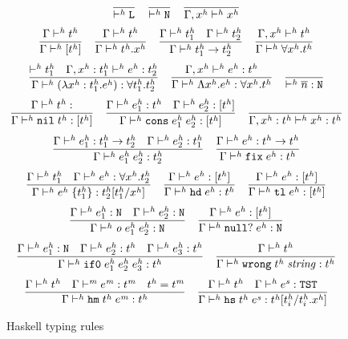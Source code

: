 \begin{figure}[p]
\[
\frac
{}
{ \vdash^{\mathit{h}} \mathtt{L}}
\quad
\frac
{}
{ \vdash^{\mathit{h}} \mathtt{N}}
\quad
\frac
{}
{\Gamma , x^{\mathit{h}} \vdash^{\mathit{h}} x^{\mathit{h}}}
\]
\[
\frac
{\Gamma \vdash^{\mathit{h}} t^{\mathit{h}}}
{\Gamma \vdash^{\mathit{h}} [t^{\mathit{h}}]}
\quad
\frac
{\Gamma \vdash^{\mathit{h}} t^{\mathit{h}}}
{\Gamma \vdash^{\mathit{h}} t^{\mathit{h}} . x^{\mathit{h}}}
\quad
\frac
{\Gamma \vdash^{\mathit{h}} t^{\mathit{h}}_{1} \quad \Gamma \vdash^{\mathit{h}} t^{\mathit{h}}_{2}}
{\Gamma \vdash^{\mathit{h}} t^{\mathit{h}}_{1} \rightarrow t^{\mathit{h}}_{2}}
\quad
\frac
{\Gamma, x^{\mathit{h}} \vdash^{\mathit{h}} t^{\mathit{h}}}
{\Gamma \vdash^{\mathit{h}} \forall x^{\mathit{h}} . t^{\mathit{h}}}
\]
\bigskip
\[
\frac
{ \vdash^{\mathit{h}} t^{\mathit{h}}_{1} \quad \Gamma , x^{\mathit{h}} : t^{\mathit{h}}_{1} \vdash^{\mathit{h}} e^{\mathit{h}} : t^{\mathit{h}}_{2}}
{\Gamma \vdash^{\mathit{h}} (\lambda x^{\mathit{h}} : t^{\mathit{h}}_{1} . e^{\mathit{h}}) : \forall t^{\mathit{h}}_{1} . t^{\mathit{h}}_{2}}
\quad
\frac
{\Gamma , x^{\mathit{h}} \vdash^{\mathit{h}} e^{\mathit{h}} : t^{\mathit{h}}}
{\Gamma \vdash^{\mathit{h}} \Lambda x^{\mathit{h}} . e^{\mathit{h}} : \forall x^{\mathit{h}} . t^{\mathit{h}}}
\quad
\frac
{}
{ \vdash^{\mathit{h}} \overline{n} : \mathtt{N}}
\]
\[
\frac
{\judeh{\env}{\vartyh}}
{\judeh{\env}{\expnils{\vartyh}}{\tylist{\vartyh}}}
\quad
\frac
{\judeh{\env}{\first{\varexph}}{\vartyh} \quad \judeh{\env}{\second{\varexph}}{\tylist{\vartyh}}}
{\judeh{\env}{\expcons{\first{\varexph}}{\second{\varexph}}}{\tylist{\vartyh}}}
\quad
\frac
{}
{\judeh{\envexte{\tyvarh}{\vartyh}}{\tyvarh}{\vartyh}}
\]
\[
\frac
{\Gamma \vdash^{\mathit{h}} e^{\mathit{h}}_{1} : t^{\mathit{h}}_{1} \rightarrow t^{\mathit{h}}_{2} \quad \Gamma \vdash^{\mathit{h}} e^{\mathit{h}}_{2} : t^{\mathit{h}}_{1}}
{\Gamma\vdash^{\mathit{h}}e^{\mathit{h}}_{1} \; e^{\mathit{h}}_{2}:t^{\mathit{h}}_2}
\quad
\frac
{\Gamma \vdash^{\mathit{h}} e^{\mathit{h}} : t^{\mathit{h}} \rightarrow t^{\mathit{h}}}
{\Gamma \vdash^{\mathit{h}} \mathtt{fix} \; e^{\mathit{h}} : t^{\mathit{h}}}
\]
\[
\frac
{\Gamma \vdash^{\mathit{h}} t^{\mathit{h}}_{1} \quad \Gamma \vdash^{\mathit{h}} e^{\mathit{h}} : \forall x^{\mathit{h}} . t^{\mathit{h}}_{2}}
{\Gamma \vdash^{\mathit{h}} e^{\mathit{h}} \; \lbrace t^{\mathit{h}}_{1} \rbrace : t^{\mathit{h}}_{2}[t^{\mathit{h}}_{1}/x^{\mathit{h}}]}
\quad
\frac
{\Gamma \vdash^{\mathit{h}} e^{\mathit{h}} : [t^{\mathit{h}}]}
{\Gamma \vdash^{\mathit{h}} \mathtt{hd} \; e^{\mathit{h}} : t^{\mathit{h}}}
\quad
\frac
{\Gamma \vdash^{\mathit{h}} e^{\mathit{h}} : [t^{\mathit{h}}]}
{\Gamma \vdash^{\mathit{h}} \mathtt{tl} \; e^{\mathit{h}} : [t^{\mathit{h}}]}
\]
\[
\frac
{\Gamma \vdash^{\mathit{h}} e^{\mathit{h}}_{1} : \mathtt{N} \quad \Gamma \vdash^{\mathit{h}} e^{\mathit{h}}_{2} : \mathtt{N}}
{\Gamma \vdash^{\mathit{h}} \mathit{o} \; e^{\mathit{h}}_{1} \; e^{\mathit{h}}_{2} : \mathtt{N}}
\quad
\frac
{\Gamma \vdash^{\mathit{h}} e^{\mathit{h}} : [t^{\mathit{h}}]}
{\Gamma \vdash^{\mathit{h}} \mathtt{null?} \; e^{\mathit{h}} : \mathtt{N}}
\]
\[
\frac
{\Gamma \vdash^{\mathit{h}} e^{\mathit{h}}_{1} : \mathtt{N} \quad \Gamma \vdash^{\mathit{h}} e^{\mathit{h}}_{2} : t^{\mathit{h}} \quad \Gamma \vdash^{\mathit{h}} e^{\mathit{h}}_{3} : t^{\mathit{h}}}
{\Gamma \vdash^{\mathit{h}} \mathtt{if0} \; e^{\mathit{h}}_{1} \; e^{\mathit{h}}_{2} \; e^{\mathit{h}}_{3} : t^{\mathit{h}}}
\quad
\frac
{\Gamma \vdash^{\mathit{h}} t^{\mathit{h}}}
{\Gamma \vdash^{\mathit{h}} \mathtt{wrong} \; t^{\mathit{h}} \; \mathit{string} : t^{\mathit{h}}}
\]
\[
\frac
{\Gamma \vdash^{\mathit{h}} t^{\mathit{h}} \quad \Gamma \vdash^{\mathit{m}} e^{\mathit{m}} : t^{\mathit{m}} \quad t^{\mathit{h}}=t^{\mathit{m}}}
{\Gamma \vdash^{\mathit{h}} \mathtt{hm} \; t^{\mathit{h}} \; e^{\mathit{m}} : t^{\mathit{h}}}
\quad
\frac
{\Gamma \vdash^{\mathit{h}} t^{\mathit{h}} \quad \Gamma \vdash^{\mathit{h}} e^{\mathit{s}} : \mathtt{TST}}
{\Gamma \vdash^{\mathit{h}} \mathtt{hs} \; t^{\mathit{h}} \; e^{\mathit{s}} : t^{\mathit{h}}[t^{\mathit{h}}_{i}/t^{\mathit{h}}_{i} . x^{\mathit{h}}]}
\]
\caption{Haskell typing rules}
\label{htr}
\end{figure}
